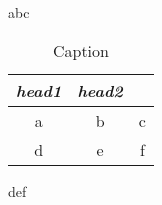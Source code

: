 


abc
	\begin{table*}
		\centering

		\caption{Caption}
	
		\begin{tabular}{*3c}
			\toprule

			\emph{head1} & \emph{head2} & \\

			\midrule
	
			a & b & c\\
			d & e & f\\
	
			\bottomrule
			\hline
		\end{tabular}
	\end{table*}
def
